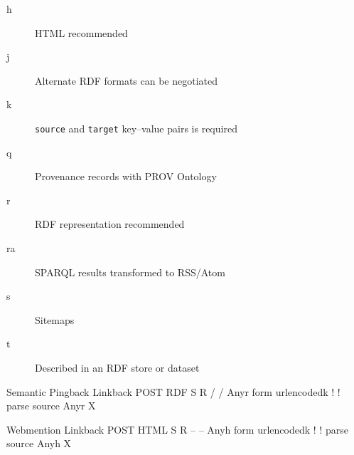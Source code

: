 \documentclass[a4paper]{llncs}
\begin{document}
                                                    
                                                    \begin{description}
  \item[h] HTML recommended\item[j] Alternate RDF formats can be negotiated\item[k] {\tt source} and {\tt target} key–value pairs is required\item[q] Provenance records with \empty PROV Ontology\item[r] RDF representation recommended\item[ra] SPARQL results transformed to RSS/Atom\item[s] \empty Sitemaps\item[t] Described in an RDF store or dataset
    \end{description}
  
                                                
                                                
                                            
                                        
                                        
                                            
                                                Semantic Pingback
                                                Linkback
                                                POST
                                                RDF
                                                S R
                                                /
                                                /
                                                Anyr
                                                form urlencodedk
                                                !
                                                ! parse source
                                                Anyr
                                                X
                                            
                                            
                                                Webmention
                                                Linkback
                                                POST
                                                HTML
                                                S R
                                                –
                                                –
                                                Anyh
                                                form urlencodedk
                                                !
                                                ! parse source
                                                Anyh
                                                X
                                            
\end{document}
